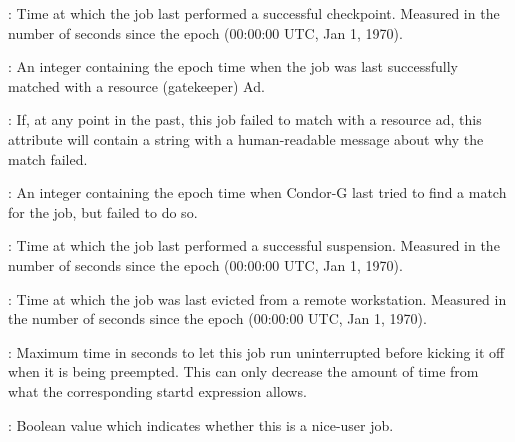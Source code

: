 \begin{description}
\item[\AdAttr{LastCkptTime}] : Time at which the job last performed a
successful checkpoint.  Measured in the number of seconds since the
epoch (00:00:00 UTC, Jan 1, 1970).

\item[\AdAttr{LastMatchTime}] : An integer containing the epoch time
when the job was last successfully matched with a resource (gatekeeper) Ad.

\item[\AdAttr{LastRejMatchReason}] :  If, at any point in the past,
this job failed to match with a resource ad,
this attribute will contain a string with a
human-readable message about why the match failed.

\item[\AdAttr{LastRejMatchTime}] :  An integer containing the epoch
time when Condor-G last tried to find a match for the job,
but failed to do so.

\item[\AdAttr{LastSuspensionTime}] : Time at which the job last performed a
successful suspension.  Measured in the number of seconds since the
epoch (00:00:00 UTC, Jan 1, 1970).

\item[\AdAttr{LastVacateTime}] : Time at which the job was last
evicted from a remote workstation.  Measured in the number of seconds
since the epoch (00:00:00 UTC, Jan 1, 1970).

\item[\AdAttr{MaxJobRetirementTime}] : Maximum time in seconds to let this
job run uninterrupted before kicking it off when it is being preempted.
This can only decrease the amount of time from what the corresponding
startd expression allows.

\item[\AdAttr{NiceUser}] : Boolean value which indicates whether
this is a nice-user job.


\end{description}
